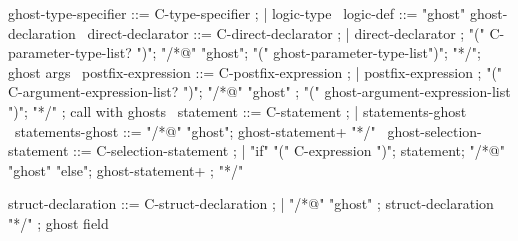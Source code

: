 \begin{syntax}

  ghost-type-specifier ::= C-type-specifier ;
  | {logic-type} \
  logic-def ::= "ghost" ghost-declaration \
  direct-declarator ::= C-direct-declarator ;
    | direct-declarator ;
    "(" C-parameter-type-list? ")";
        {"/*@" "ghost"};
          {"(" ghost-parameter-type-list")"};
          {"*/"}; ghost args
        \
  postfix-expression ::= C-postfix-expression ;
    | postfix-expression ;
     "(" C-argument-expression-list? ")";
     {"/*@" "ghost"} ;
     {  "(" ghost-argument-expression-list ")"};
     {  "*/"} ; call with ghosts
    \
  statement ::= C-statement ;
             | statements-ghost \
  statements-ghost ::= "/*@" "ghost";
                       ghost-statement+ "*/" \
  ghost-selection-statement ::= C-selection-statement ;
    | "if" "(" C-expression ")";
       statement;
      {"/*@" "ghost" "else"};
      {  ghost-statement+ };
      {  "*/"} \

  struct-declaration ::= C-struct-declaration ;
  | {"/*@" "ghost" };
    { struct-declaration "*/"} ; ghost field

\end{syntax}

